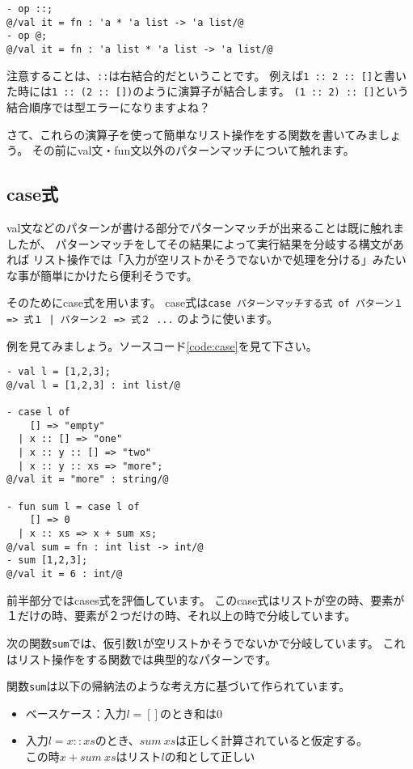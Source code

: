 \documentclass[11pt,a4paper]{article}
\begin{document}
\begin{lstlisting}[caption=リスト操作演算子の型,label=code:list-operators]
- op ::;
@/val it = fn : 'a * 'a list -> 'a list/@
- op @;
@/val it = fn : 'a list * 'a list -> 'a list/@
\end{lstlisting}

注意することは、\lstinline{::}は右結合的だということです。
例えば\lstinline{1 :: 2 :: []}と書いた時には\lstinline{1 :: (2 :: [])}のように演算子が結合します。
\lstinline{(1 :: 2) :: []}という結合順序では型エラーになりますよね？

さて、これらの演算子を使って簡単なリスト操作をする関数を書いてみましょう。
その前にval文・fun文以外のパターンマッチについて触れます。

\subsection{case式}

val文などのパターンが書ける部分でパターンマッチが出来ることは既に触れましたが、
パターンマッチをしてその結果によって実行結果を分岐する構文があれば
リスト操作では「入力が空リストかそうでないかで処理を分ける」みたいな事が簡単にかけたら便利そうです。

そのためにcase式を用います。
case式は\lstinline{case パターンマッチする式 of パターン１ => 式１ | パターン２ => 式２ ...}
のように使います。

例を見てみましょう。ソースコード\ref{code:case}を見て下さい。

\begin{lstlisting}[caption=case式,label=code:case]
- val l = [1,2,3];
@/val l = [1,2,3] : int list/@

- case l of
    [] => "empty"
  | x :: [] => "one"
  | x :: y :: [] => "two"
  | x :: y :: xs => "more";
@/val it = "more" : string/@

- fun sum l = case l of
    [] => 0
  | x :: xs => x + sum xs;
@/val sum = fn : int list -> int/@
- sum [1,2,3];
@/val it = 6 : int/@
\end{lstlisting}

前半部分ではcases式を評価しています。
このcase式はリストが空の時、要素が１だけの時、要素が２つだけの時、それ以上の時で分岐しています。

次の関数\lstinline{sum}では、仮引数\lstinline{l}が空リストかそうでないかで分岐しています。
これはリスト操作をする関数では典型的なパターンです。

関数\lstinline{sum}は以下の帰納法のような考え方に基づいて作られています。
\begin{itemize}
\item ベースケース：入力$l = []$のとき和は0
\item 入力$l = x :: xs$のとき、$sum \ xs$は正しく計算されていると仮定する。\\
  この時$x + sum \ xs$はリスト$l$の和として正しい
\end{itemize}
\end{document}
